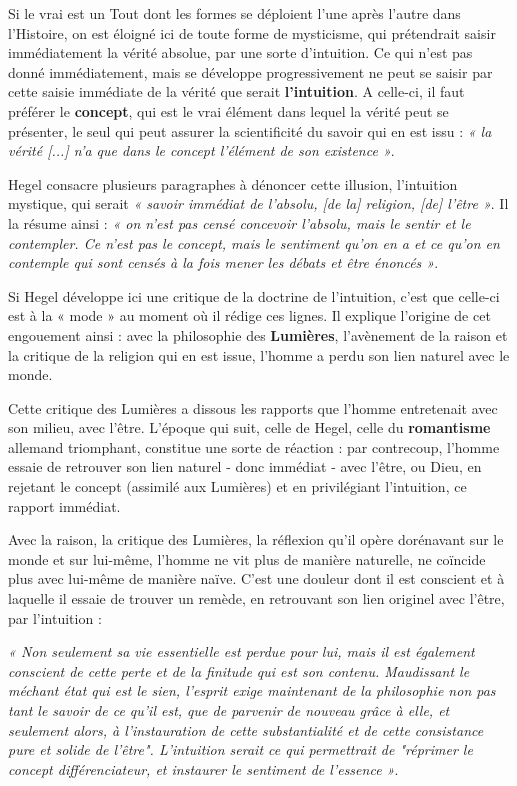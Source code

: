 Si le vrai est un Tout dont les formes se déploient l’une après l’autre dans l’Histoire, on est éloigné ici de toute forme de mysticisme, qui prétendrait saisir immédiatement la vérité absolue, par une sorte d’intuition. Ce qui n’est pas donné immédiatement, mais se développe progressivement ne peut se saisir par cette saisie immédiate de la vérité que serait {\bf l’intuition}. A celle-ci, il faut préférer le {\bf concept}, qui est le vrai élément dans lequel la vérité peut se présenter, le seul qui peut assurer la scientificité du savoir qui en est issu : {\it « la vérité [...] n’a que dans le concept l’élément de son existence »}.

Hegel consacre plusieurs paragraphes à dénoncer cette illusion, l’intuition mystique, qui serait {\it « savoir immédiat de l’absolu, [de la] religion, [de] l’être »}. Il la résume ainsi : {\it « on n’est pas censé concevoir l’absolu, mais le sentir et le contempler. Ce n’est pas le concept, mais le sentiment qu’on en a et ce qu’on en contemple qui sont censés à la fois mener les débats et être énoncés »}.

Si Hegel développe ici une critique de la doctrine de l’intuition, c’est que celle-ci est à la « mode » au moment où il rédige ces lignes. Il explique l’origine de cet engouement ainsi : avec la philosophie des {\bf Lumières}, l’avènement de la raison et la critique de la religion qui en est issue, l’homme a perdu son lien naturel avec le monde.

Cette critique des Lumières a dissous les rapports que l’homme entretenait avec son milieu, avec l’être. L’époque qui suit, celle de Hegel, celle du {\bf romantisme} allemand triomphant, constitue une sorte de réaction : par contrecoup, l’homme essaie de retrouver son lien naturel - donc immédiat - avec l’être, ou Dieu, en rejetant le concept (assimilé aux Lumières) et en privilégiant l’intuition, ce rapport immédiat.

Avec la raison, la critique des Lumières, la réflexion qu’il opère dorénavant sur le monde et sur lui-même, l’homme ne vit plus de manière naturelle, ne coïncide plus avec lui-même de manière naïve. C’est une douleur dont il est conscient et à laquelle il essaie de trouver un remède, en retrouvant son lien originel avec l’être, par l’intuition :

{\it « Non seulement sa vie essentielle est perdue pour lui, mais il est également conscient de cette perte et de la finitude qui est son contenu. Maudissant le méchant état qui est le sien, l’esprit exige maintenant de la philosophie non pas tant le savoir de ce qu’il est, que de parvenir de nouveau grâce à elle, et seulement alors, à l’instauration de cette substantialité et de cette consistance pure et solide de l’être". L’intuition serait ce qui permettrait de "réprimer le concept différenciateur, et instaurer le sentiment de l’essence »}.

